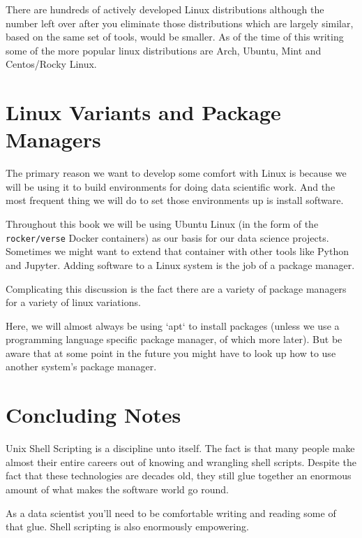 \documentclass[11pt]{article}
\begin{document}
There are hundreds of actively developed Linux distributions although
the number left over after you eliminate those distributions which are
largely similar, based on the same set of tools, would be smaller. As
of the time of this writing some of the more popular linux
distributions are Arch, Ubuntu, Mint and Centos/Rocky Linux.

\section{Linux Variants and Package Managers}
\label{sec:orge5cc5e8}

The primary reason we want to develop some comfort with Linux is
because we will be using it to build environments for doing data
scientific work. And the most frequent thing we will do to set those
environments up is install software.

Throughout this book we will be using Ubuntu Linux (in the form of the
\texttt{rocker/verse} Docker containers) as our basis for our data science
projects. Sometimes we might want to extend that container with other
tools like Python and Jupyter. Adding software to a Linux system is
the job of a package manager.

Complicating this discussion is the fact there are a variety of
package managers for a variety of linux variations.

Here, we will almost always be using `apt` to install packages (unless
we use a programming language specific package manager, of which more
later). But be aware that at some point in the future you might have
to look up how to use another system's package manager.

\section{Concluding Notes}
\label{sec:org10142a8}

Unix Shell Scripting is a discipline unto itself. The fact is that
many people make almost their entire careers out of knowing and
wrangling shell scripts. Despite the fact that these technologies are
decades old, they still glue together an enormous amount of what makes
the software world go round. 

As a data scientist you'll need to be comfortable writing and reading
some of that glue. Shell scripting is also enormously empowering.
\end{document}
